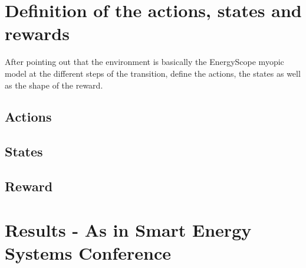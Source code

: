 

\section{Definition of the actions, states and rewards}
\label{sec:act_states_rew}
After pointing out that the environment is basically the EnergyScope myopic model at the different steps of the transition, define the actions, the states as well as the shape of the reward.

\subsection{Actions}
\subsection{States}
\subsection{Reward}

\section{Results - As in Smart Energy Systems Conference}

%

%


